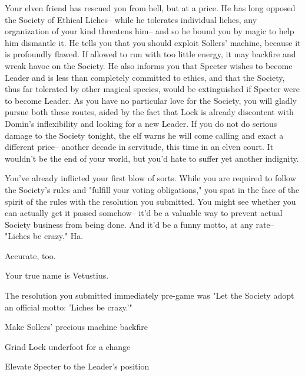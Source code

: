 \documentclass[char]{Sel}
\begin{document}
Your elven friend has rescued you from hell, but at a price. He has long opposed the Society of Ethical Liches-- while he tolerates individual liches, any organization of your kind threatens him-- and so he bound you by magic to help him dismantle it. He tells you that you should exploit Sollers' machine, because it is profoundly flawed. If allowed to run with too little energy, it may backfire and wreak havoc on the Society. He also informs you that Specter wishes to become Leader and is less than completely committed to ethics, and that the Society, thus far tolerated by other magical species, would be extinguished if Specter were to become Leader. As you have no particular love for the Society, you will gladly pursue both these routes, aided by the fact that Lock is already discontent with Domin's inflexibility and looking for a new Leader. If you do not do serious damage to the Society tonight, the elf warns he will come calling and exact a different price-- another decade in servitude, this time in an elven court. It wouldn't be the end of your world, but you'd hate to suffer yet another indignity.

You've already inflicted your first blow of sorts. While you are required to follow the Society's rules and "fulfill your voting obligations," you spat in the face of the spirit of the rules with the resolution you submitted. You might see whether you can actually get it passed somehow-- it'd be a valuable way to prevent actual Society business from being done. And it'd be a funny motto, at any rate-- "Liches be crazy." Ha.

Accurate, too.

\begin{itemz}[Notes]
  \item Your true name is Vetustius.
  \item The resolution you submitted immediately pre-game was "Let the Society adopt an official motto: 'Liches be crazy.'"
    \end{itemz}
    
 \begin{itemz}[Goals]
\item Make Sollers' precious machine backfire
\item Grind Lock underfoot for a change
\item Elevate Specter to the Leader's position
\end{itemz}
\end{document}

